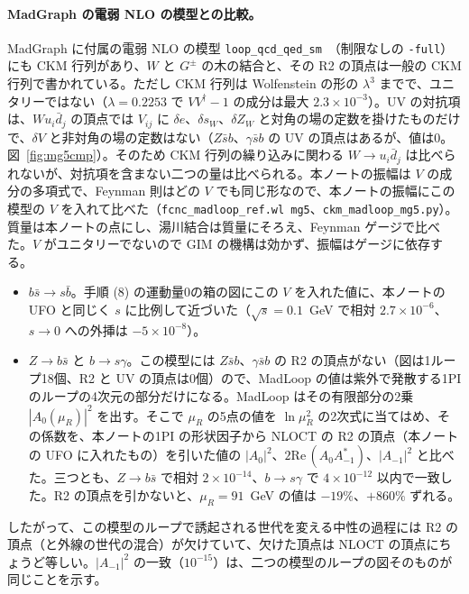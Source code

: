 \documentclass[a4paper,10pt]{ltjsarticle}
\newcommand{\re}{\mathrm{Re}\,}
\begin{document}
\paragraph{MadGraph の電弱 NLO の模型との比較。}MadGraph に付属の電弱 NLO の模型 \texttt{loop\_qcd\_qed\_sm}~\cite{mg5ew}（制限なしの \texttt{-full}）にも CKM 行列があり、$W$ と $G^\pm$ の木の結合と、その R2 の頂点は一般の CKM 行列で書かれている。ただし CKM 行列は Wolfenstein の形の $\lambda^3$ までで、ユニタリーではない（$\lambda=0.2253$ で $VV^\dagger-1$ の成分は最大 $2.3\times10^{-3}$）。UV の対抗項は、$W u_i\bar d_j$ の頂点では $V_{ij}$ に $\delta e$、$\delta s_W$、$\delta Z_W$ と対角の場の定数を掛けたものだけで、$\delta V$ と非対角の場の定数はない（$Z\bar sb$、$\gamma\bar sb$ の UV の頂点はあるが、値は0。図~\ref{fig:mg5cmp}）。そのため CKM 行列の繰り込みに関わる $W\to u_i\bar d_j$ は比べられないが、対抗項を含まない二つの量は比べられる。本ノートの振幅は $V$ の成分の多項式で、Feynman 則はどの $V$ でも同じ形なので、本ノートの振幅にこの模型の $V$ を入れて比べた（\texttt{fcnc\_madloop\_ref.wl mg5}、\texttt{ckm\_madloop\_mg5.py}）。質量は本ノートの点にし、湯川結合は質量にそろえ、Feynman ゲージで比べた。$V$ がユニタリーでないので GIM の機構は効かず、振幅はゲージに依存する。
\begin{itemize}
\item[(i)] $b\bar s\to s\bar b$。手順 (8) の運動量0の箱の図にこの $V$ を入れた値に、本ノートの UFO と同じく $s$ に比例して近づいた（$\sqrt s=0.1$~GeV で相対 $2.7\times10^{-6}$、$s\to0$ への外挿は $-5\times10^{-8}$）。
\item[(ii)] $Z\to b\bar s$ と $b\to s\gamma$。この模型には $Z\bar sb$、$\gamma\bar sb$ の R2 の頂点がない（図は1ループ18個、R2 と UV の頂点は0個）ので、MadLoop の値は紫外で発散する1PI のループの4次元の部分だけになる。MadLoop はその有限部分の2乗 $|A_0(\mu_R)|^2$ を出す。そこで $\mu_R$ の5点の値を $\ln\mu_R^2$ の2次式に当てはめ、その係数を、本ノートの1PI の形状因子から NLOCT の R2 の頂点（本ノートの UFO に入れたもの）を引いた値の $|A_0|^2$、$2\re(A_0A_{-1}^*)$、$|A_{-1}|^2$ と比べた。三つとも、$Z\to b\bar s$ で相対 $2\times10^{-14}$、$b\to s\gamma$ で $4\times10^{-12}$ 以内で一致した。R2 の頂点を引かないと、$\mu_R=91$~GeV の値は $-19\%$、$+860\%$ ずれる。
\end{itemize}
したがって、この模型のループで誘起される世代を変える中性の過程には R2 の頂点（と外線の世代の混合）が欠けていて、欠けた頂点は NLOCT の頂点にちょうど等しい。$|A_{-1}|^2$ の一致（$10^{-15}$）は、二つの模型のループの図そのものが同じことを示す。
\end{document}
